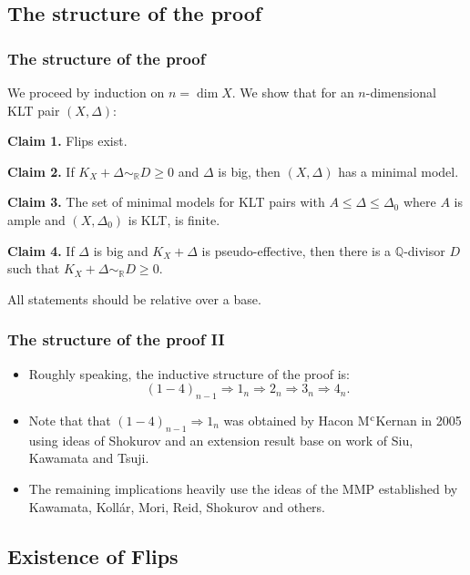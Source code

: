 \documentclass{beamer}
\theoremstyle{plain}
\theoremstyle{definition}
\theoremstyle{remark}
\def\Q{\mathbb {Q}}
\begin{document}
\subsection{The structure of the proof}
\begin{frame}
\frametitle{The structure of the proof}
We proceed by induction on $n=\dim X$. We show that for an $n$-dimensional KLT pair $(X,\Delta)$:

\pause
{\bf Claim 1.} Flips exist.

{\pause
\bf Claim 2.} If $K_X+\Delta \sim _{\mathbb{R}}D\geq 0$ and $\Delta$ is big, then
$(X,\Delta )$ has a minimal model.

\pause
{\bf Claim 3.} The set of minimal models for KLT pairs with $A\leq \Delta
\leq \Delta _0$ where $A$ is ample and $(X,\Delta _0)$ is KLT, is finite.

\pause
{\bf Claim 4.} If $\Delta $ is big and $K_X+\Delta$ is pseudo-effective, then there is a $\Q$-divisor $D$ such that
$K_X+\Delta \sim _{\mathbb {R}}D\geq 0$.

\pause
All statements should be relative over a base.

\end{frame}
\begin{frame}
\frametitle{The structure of the proof II}
\begin{itemize}
\item Roughly speaking, the inductive structure of the proof is:
$$ (1-4)_{n-1}\Rightarrow 1_n\Rightarrow 2_n\Rightarrow 3_n \Rightarrow 4_n.$$
\pause
\item Note that that $(1-4)_{n-1}\Rightarrow 1_n$ was obtained by
Hacon M$^{\rm c}$Kernan in 2005 using ideas of Shokurov and 
an extension result base on work of Siu, Kawamata and Tsuji.

\pause
\item The remaining implications heavily use the ideas of the MMP established by
Kawamata, Koll\'ar, Mori, Reid, Shokurov and others.
\end{itemize}


\end{frame}

\subsection{Existence of Flips}
\end{document}
